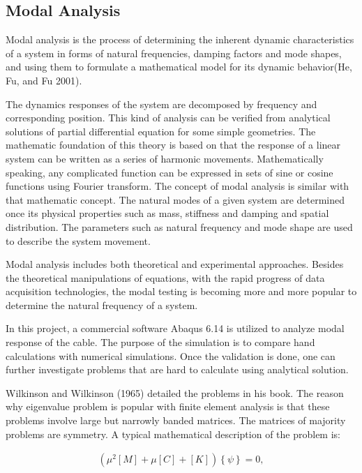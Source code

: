 \documentclass[paper=a4, fontsize=11pt]{scrartcl} %
\numberwithin{equation}{section} %
\numberwithin{figure}{section} %
\numberwithin{table}{section} %
\begin{document}
\subsection{Modal Analysis}
\label{sec:modal-analysis}

Modal analysis is the process of determining the inherent dynamic
characteristics of a system in forms of natural frequencies, damping
factors and mode shapes, and using them to formulate a mathematical
model for its dynamic behavior(He, Fu, and Fu 2001).

The dynamics responses of the system are decomposed by frequency and
corresponding position. This kind of analysis can be verified from
analytical solutions of partial differential equation for some simple
geometries. The mathematic foundation of this theory is based on that
the response of a linear system can be written as a series of
harmonic movements. Mathematically speaking, any complicated function
can be expressed in sets of sine or cosine functions using Fourier
transform. The concept of modal analysis is similar with that
mathematic concept. The natural modes of a given system are determined
once its physical properties such as mass, stiffness and damping and
spatial distribution. The parameters such as natural frequency and
mode shape are used to describe the system movement.

Modal analysis includes both theoretical and experimental approaches.
Besides the theoretical manipulations of equations, with the rapid
progress of data acquisition technologies, the modal testing is becoming
more and more popular to determine the natural frequency of a system.

In this project, a commercial software Abaqus 6.14 is utilized to
analyze modal response of the cable. The purpose of the simulation is
to compare hand calculations with numerical simulations. Once the
validation is done, one can further investigate problems that are hard
to calculate using analytical solution.

Wilkinson and Wilkinson (1965) detailed the problems in his book. The
reason why eigenvalue problem is popular with finite element analysis
is that these problems involve large but narrowly banded matrices. The
matrices of majority problems are symmetry. A typical mathematical
description of the problem is:

\begin{align}
\left(\mu^2\left[M\right]+\mu\left[C\right]+\left[K\right]\right)\left\{\psi\right\}=0,
\end{align}
\end{document}
